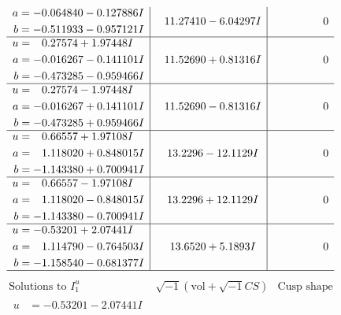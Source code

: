 \documentclass[1p]{elsarticle_modified}
\theoremstyle{definition}
\newcommand{\I}{\sqrt{-1}}
\begin{document}
$$\begin{array}{c|c|c}
\begin{aligned}
a &= -0.064840 - 0.127886 I \\
b &= -0.511933 - 0.957121 I\end{aligned}
 & \phantom{-}11.27410 - 6.04297 I & \phantom{-0.000000 } 0 \\ \hline\begin{aligned}
u &= \phantom{-}0.27574 + 1.97448 I \\
a &= -0.016267 - 0.141101 I \\
b &= -0.473285 - 0.959466 I\end{aligned}
 & \phantom{-}11.52690 + 0.81316 I & \phantom{-0.000000 } 0 \\ \hline\begin{aligned}
u &= \phantom{-}0.27574 - 1.97448 I \\
a &= -0.016267 + 0.141101 I \\
b &= -0.473285 + 0.959466 I\end{aligned}
 & \phantom{-}11.52690 - 0.81316 I & \phantom{-0.000000 } 0 \\ \hline\begin{aligned}
u &= \phantom{-}0.66557 + 1.97108 I \\
a &= \phantom{-}1.118020 + 0.848015 I \\
b &= -1.143380 + 0.700941 I\end{aligned}
 & \phantom{-}13.2296 - 12.1129 I & \phantom{-0.000000 } 0 \\ \hline\begin{aligned}
u &= \phantom{-}0.66557 - 1.97108 I \\
a &= \phantom{-}1.118020 - 0.848015 I \\
b &= -1.143380 - 0.700941 I\end{aligned}
 & \phantom{-}13.2296 + 12.1129 I & \phantom{-0.000000 } 0 \\ \hline\begin{aligned}
u &= -0.53201 + 2.07441 I \\
a &= \phantom{-}1.114790 - 0.764503 I \\
b &= -1.158540 - 0.681377 I\end{aligned}
 & \phantom{-}13.6520 + 5.1893 I & \phantom{-0.000000 } 0\\
 \hline 
 \end{array}$$\newpage$$\begin{array}{c|c|c}  
\text{Solutions to }I^u_{1}& \I (\text{vol} + \sqrt{-1}CS) & \text{Cusp shape}\\
 \hline 
\begin{aligned}
u &= -0.53201 - 2.07441 I \\

\end{aligned}
\end{array}$$
\end{document}
